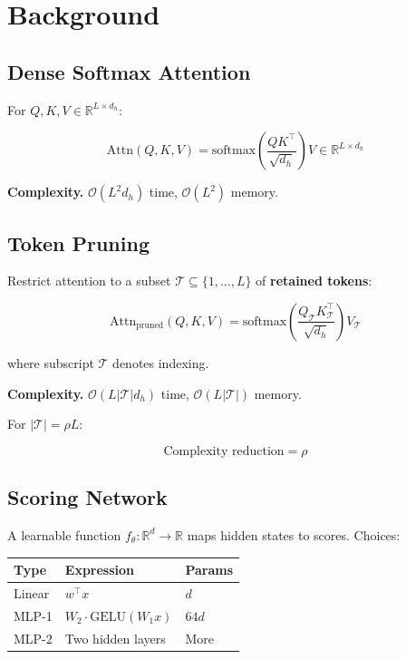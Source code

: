 
\section{Background}

\subsection{Dense Softmax Attention}

For $Q, K, V \in \mathbb{R}^{L \times d_h}$:

\[
\text{Attn}(Q, K, V) = \text{softmax}\!\left(\frac{Q K^\top}{\sqrt{d_h}}\right) V \in \mathbb{R}^{L \times d_h}
\tag{3.1}
\]

\textbf{Complexity.} $\mathcal{O}(L^2 d_h)$ time, $\mathcal{O}(L^2)$ memory.

\subsection{Token Pruning}

Restrict attention to a subset $\mathcal{T} \subseteq \{1, \dots, L\}$ 
of \textbf{retained tokens}:

\[
\text{Attn}_\text{pruned}(Q, K, V) = \text{softmax}\!\left(\frac{Q_\mathcal{T} K_\mathcal{T}^\top}{\sqrt{d_h}}\right) V_\mathcal{T}
\tag{3.2}
\]

where subscript $\mathcal{T}$ denotes indexing.

\textbf{Complexity.} $\mathcal{O}(L |\mathcal{T}| d_h)$ time, $\mathcal{O}(L |\mathcal{T}|)$ memory.

For $|\mathcal{T}| = \rho L$:

\[
\text{Complexity reduction} = \rho
\tag{3.3}
\]

\subsection{Scoring Network}

A learnable function $f_\theta: \mathbb{R}^d \to \mathbb{R}$ maps hidden 
states to scores. Choices:

\begin{table}[H]
\centering
\small
\begin{tabular}{lll}
\toprule
\textbf{Type} & \textbf{Expression} & \textbf{Params} \\
\midrule
Linear & $w^\top x$ & $d$ \\
MLP-1 & $W_2 \cdot \text{GELU}(W_1 x)$ & $64 d$ \\
MLP-2 & Two hidden layers & More \\
\bottomrule
\end{tabular}
\end{table}

